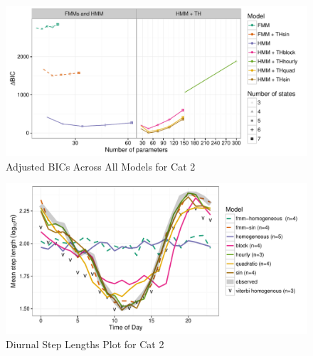 \documentclass{article}\usepackage[]{graphicx}\usepackage{xcolor}
\makeatletter
\def\maxwidth{ %
  \ifdim\Gin@nat@width>\linewidth
    \linewidth
  \else
    \Gin@nat@width
  \fi
}
\newenvironment{knitrout}{}{} %
\makeatother
\begin{document}
\clearpage
\begin{knitrout}
\color{fgcolor}\begin{figure}
\includegraphics[width=\maxwidth]{figure/adj_BIC_comparisons2-1} \caption[Adjusted BICs Across All Models for Cat 2]{Adjusted BICs Across All Models for Cat 2}\label{fig:adj_BIC_comparisons2}
\end{figure}


\end{knitrout}

\clearpage

\begin{knitrout}
\color{fgcolor}\begin{figure}
\includegraphics[width=\maxwidth]{figure/avg_step_length_by_time2-1} \caption[Diurnal Step Lengths Plot for Cat 2]{Diurnal Step Lengths Plot for Cat 2}\label{fig:avg_step_length_by_time2}
\end{figure}


\end{knitrout}

\clearpage
\end{document}
